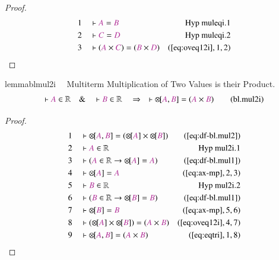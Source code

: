 \begin{proof}
\begin{align}
  1 &&  & \vdash \mc{A} = \mc{B}&\text{Hyp~muleqi.1}\notag%
  \\ 2 &&  & \vdash \mc{C} = \mc{D}&\text{Hyp~muleqi.2}\notag%
  \\ 3 &&  & \vdash ( \mc{A} \times \mc{C} ) = ( \mc{B} \times \mc{D}
      )&(\mbox{\ref{eq:oveq12i}},1,2)\notag
\end{align}
\end{proof}

\begin{restatable}{lemma}{blmul2i}~~ Multiterm Multiplication of Two Values is
their Product.
\begin{align}
\vdash \mc{A} \in \mathbb{R}\quad\&\quad \vdash \mc{B} \in
    \mathbb{R}\quad\Rightarrow\quad \vdash {\otimes\hspace{-1pt}[} \mc{A} ,
    \mc{B} ] = ( \mc{A} \times \mc{B} )\label{eq:bl.mul2i}\tag{bl.mul2i}
\end{align}
\end{restatable}

\begin{proof}
\begin{align}
  1 &&  & \vdash {\otimes\hspace{-1pt}[} \mc{A} , \mc{B} ] = (
      {\otimes\hspace{-1pt}[} \mc{A} ] \times
      {\otimes\hspace{-1pt}[} \mc{B} ]
      )&(\mbox{\ref{eq:df-bl.mul2}})\notag
  \\ 2 &&  & \vdash \mc{A} \in \mathbb{R}&\text{Hyp~mul2i.1}\notag%
  \\ 3 &&  & \vdash ( \mc{A} \in \mathbb{R} \rightarrow {\otimes\hspace{-1pt}[}
      \mc{A} ] = \mc{A}
      )&(\mbox{\ref{eq:df-bl.mul1}})\notag
  \\ 4 &&  & \vdash {\otimes\hspace{-1pt}[} \mc{A} ] =
      \mc{A}&(\mbox{\ref{eq:ax-mp}},2,3)\notag
  \\ 5 &&  & \vdash \mc{B} \in \mathbb{R}&\text{Hyp~mul2i.2}\notag%
  \\ 6 &&  & \vdash ( \mc{B} \in \mathbb{R} \rightarrow {\otimes\hspace{-1pt}[}
      \mc{B} ] = \mc{B}
      )&(\mbox{\ref{eq:df-bl.mul1}})\notag
  \\ 7 &&  & \vdash {\otimes\hspace{-1pt}[} \mc{B} ] =
      \mc{B}&(\mbox{\ref{eq:ax-mp}},5,6)\notag
  \\ 8 &&  & \vdash ( {\otimes\hspace{-1pt}[} \mc{A} ] \times
      {\otimes\hspace{-1pt}[} \mc{B} ] ) = ( \mc{A} \times
      \mc{B} )&(\mbox{\ref{eq:oveq12i}},4,7)\notag
  \\ 9 &&  & \vdash {\otimes\hspace{-1pt}[} \mc{A} , \mc{B} ] = ( \mc{A} \times
      \mc{B} )&(\mbox{\ref{eq:eqtri}},1,8)\notag
\end{align}
\end{proof}

